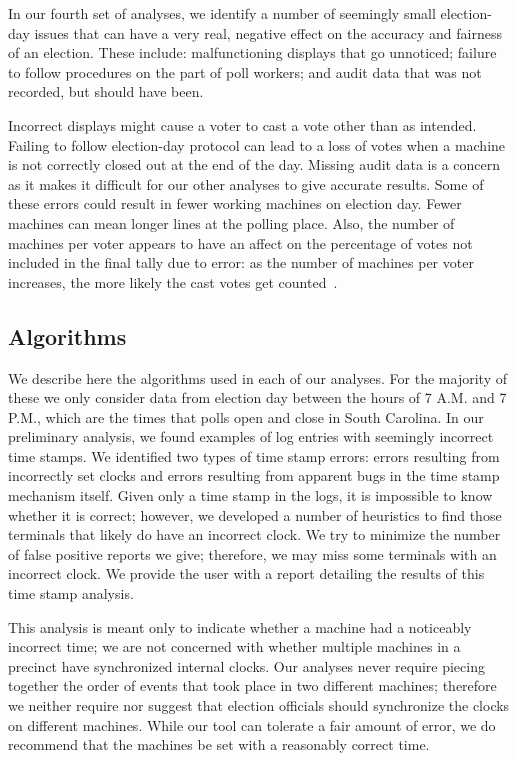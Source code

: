 \documentclass[letterpaper,twocolumn,10pt]{article}
\begin{document}
In our fourth set of analyses, we identify a number of seemingly small
election-day issues that can have a very real, negative effect on the accuracy
and fairness of an election. These include:
malfunctioning
displays that go unnoticed; failure to follow procedures on the part of poll
workers; and audit data that was not recorded, but should have been.

Incorrect displays might cause a voter to cast a vote other than as intended. Failing to follow election-day protocol can lead to a loss of votes when a
machine is not correctly closed out at the end of the day. Missing audit data is
a concern as it makes it difficult for our other analyses to give accurate results. Some of these errors 
could result in fewer working machines on election day. Fewer machines can mean longer lines at the polling place. Also, the number of machines per voter appears to have an 
affect on the percentage of votes not included in the final tally due to error: 
as the number of machines per voter increases, the more likely the cast votes 
get counted~\cite{DNC2005}.

 
\subsection{Algorithms}
We describe here the algorithms used in each of our analyses. For the
majority of these we only consider data from election day between the hours of
7 A.M. and 7 P.M., which are the times that polls open and close in South
Carolina. In our preliminary analysis, we found examples of log entries with
seemingly incorrect time stamps. We identified two types of time stamp errors:
errors resulting from incorrectly set clocks and errors resulting from apparent
bugs in the time stamp mechanism itself. Given only a time stamp in the logs, it
is impossible to know whether it is correct; however, we developed a number of
heuristics to find those terminals that likely do have an incorrect clock. We
try to minimize the number of false positive reports we give; therefore, we
may miss some terminals with an incorrect clock. We provide the user with a report detailing the
results of this time stamp analysis. 

This analysis is meant only to indicate whether a 
machine had a noticeably incorrect time; we are not concerned with whether
multiple machines in a precinct have synchronized internal clocks. Our 
analyses never require piecing together the order of events that took place in two 
different machines; therefore we neither require nor suggest that 
election officials should synchronize the clocks on different machines. While 
our tool can tolerate a fair amount of error, we do 
recommend that the machines be set with a reasonably correct time.
\end{document}
